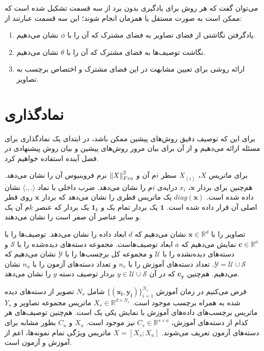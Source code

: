  می‌توان گفت که هر روش برای یادگیری بدون برد از سه قسمت تشکیل شده است که ممکن است به صورت مستقل یا همزمان انجام شوند؛ این سه قسمت عبارتند از:
\begin{enumerate}
  \item یادگرفتن نگاشتی از فضای تصاویر به فضای مشترک
  که آن را با $\phi$ نشان می‌دهیم.
  \item نگاشت توصیف‌ها به فضای مشترک
  که آن را با $\theta$ نشان می‌دهیم.
  \item
   ارائه روشی برای تعیین مشابهت در این فضای مشترک و اختصاص برچسب به تصاویر.
\end{enumerate}

\section{نماد‌گذاری}\label{notaion}
برای این که توصیف دقیق روش‌های پیشین ممکن باشد، در ابتدای یک نمادگذاری برای مسئله ارائه می‌دهیم و از آن برای بیان مرور روش‌های پیشین و بیان روش پیشنهادی در فصل آینده استفاده خواهیم کرد.

برای ماتریس $X$،    
$X_{(i)}$
 سطر $i$م آن و 
$\left \lVert X \right \rVert_{Fro}^2$
نرم فروبنیوس آن را نشان می‌دهد. هم‌چنین برای بردار $\mathbf{x}$،
 $x_i$ 
 درایه‌ی $i$م را نشان می‌دهد.
    ضرب داخلی با نماد  $\langle ., . \rangle $ نشان داده شده است.
$diag(\mathbf{x})$
یک ماتریس قطری  را نشان می‌دهد که بردار $\mathbf{x} $ روی قطر اصلی آن قرار داده شده است.  $\mathbf{1}$ یک بردار تمام یک و $\mathbf{1}_k$ یک بردار که عنصر $k$م آن یک و سایر عناصر آن صفر است را نشان می‌دهند. 

 تصاویر را با
 $\mathbf{x}  \in \mathbb{R}^d$
 نشان می‌دهیم که $d$ ابعاد داده را نشان می‌دهد. توصیف‌ها را با
 $ \mathbf{c}  \in \mathbb{R}^a$
 نمایش می‌دهیم که  $a$ ابعاد توصیف‌هاست. مجموعه دسته‌های دیده‌شده را با  $ \mathcal{S}$ و دسته‌های دیده‌نشده را با $ \mathcal{U}$ و مجموعه کل برچسب‌ها را با $ \mathcal{Y}$
 نشان می‌دهیم که
 $ \mathcal{Y} =  \mathcal{U} \cup \mathcal{S} $.
 تعداد دسته‌های آموزش را با $n_s$ و تعداد دسته‌های آزمون را با $n_u$ نشان می‌دهیم.
هم‌چنین   $\mathbf{c_y} $ که در آن    $ y \in \mathcal{U} \cup \mathcal{S} $ بردار توصیف دسته $y$ را نشان می‌دهد.

    فرض می‌کنیم در زمان آموزش 
    $ \{ (\mathbf{x_i, y_i}) \}_{i=1}^{N_s} $
     شامل $N_s$
     تصویر از دسته‌های دیده شده به همراه برچسب  موجود است.
     $X_s \in \mathbb{R}^{d \times N_s }$
  ماتریس مجموعه تصاویر و $Y_s$ ماتریس برچسب‌های داده‌های آموزش با نمایش یکی یک
   است.  هم‌چنین توصیف‌های هر کدام از دسته‌های آموزش،
  $C_s \in \mathbb{R}^{s \times a}$
 نیز موجود است. $X_u$ و $C_u$ بطور مشابه برای دسته‌های آزمون تعریف می‌شوند.
$ X = [X_s;X_u]$
ماتریس ویژگی تمام نمونه‌ها، اعم از آموزش و آزمون است.


